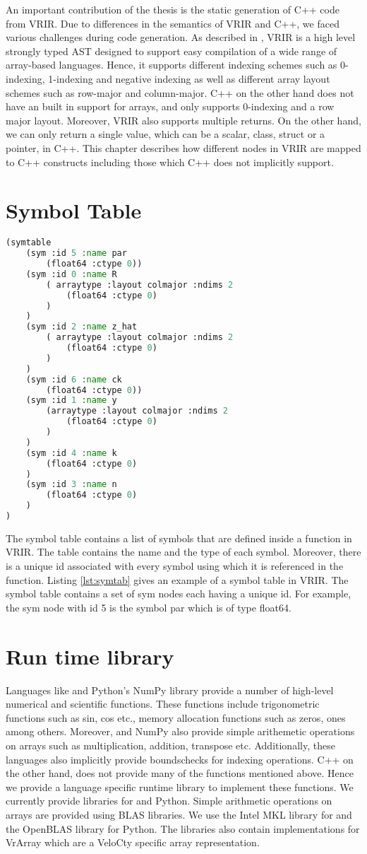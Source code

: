 An important contribution of the thesis is the static generation of C++ code from VRIR. Due to differences in the semantics of VRIR and C++, we faced various challenges during code generation. As described in , VRIR is a high level strongly typed AST designed to support easy compilation of a wide range of array-based languages. Hence, it supports different indexing schemes such as 0-indexing, 1-indexing and negative indexing as well as different array layout schemes such as row-major and column-major. C++ on the other hand does not have an built in support for arrays, and only supports 0-indexing and a row major layout. Moreover, VRIR also supports multiple returns. On the other hand, we can only return a single value, which can be a scalar, class, struct or a pointer, in C++. This chapter describes how different nodes in VRIR are mapped to C++ constructs including those which C++ does not implicitly support.
\section{Symbol Table}
\begin{lstlisting}[float,language=lisp, label={lst:symtab}, caption={Symbol table in VRIR}]
(symtable
	(sym :id 5 :name par 
		(float64 :ctype 0)) 
	(sym :id 0 :name R 
		( arraytype :layout colmajor :ndims 2
			(float64 :ctype 0)
		)
	) 
	(sym :id 2 :name z_hat 
		( arraytype :layout colmajor :ndims 2
			(float64 :ctype 0)
		)
	) 
	(sym :id 6 :name ck 
		(float64 :ctype 0)) 
	(sym :id 1 :name y 
		(arraytype :layout colmajor :ndims 2
			(float64 :ctype 0)
		)
	) 
	(sym :id 4 :name k 
		(float64 :ctype 0)
	) 
	(sym :id 3 :name n 
		(float64 :ctype 0)
	) 
)
\end{lstlisting}
The symbol table contains a list of symbols that are defined inside a function in VRIR. The table contains the name and the type of each symbol. Moreover, there is a unique id associated with every symbol using which it is referenced in the function. Listing \ref{lst:symtab} gives an example of a symbol table in VRIR. The symbol table contains a set of sym nodes each having a unique id. For example, the sym node with id 5 is the symbol par which is of type float64.
\section{Run time library}
Languages like \matlab and Python's NumPy library provide a number of high-level numerical and scientific functions. These functions include trigonometric functions such as sin, cos etc., memory allocation functions such as zeros, ones among others. Moreover, \matlab and NumPy also provide simple arithemetic operations on arrays such as multiplication, addition, transpose etc. Additionally, these languages also implicitly provide boundschecks for indexing operations. C++ on the other hand, does not provide many of the functions mentioned above. Hence we provide a language specific runtime library to implement these functions. We currently provide libraries for \matlab and Python. Simple arithmetic operations on arrays are provided using BLAS libraries. We use the Intel MKL library for \matlab and the OpenBLAS library for Python. The libraries also contain implementations for VrArray which are a VeloCty specific array representation. 

